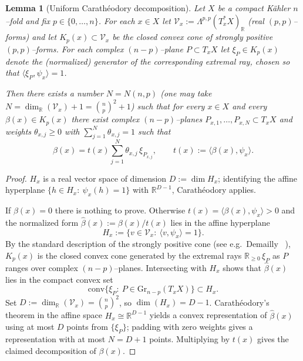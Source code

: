 \documentclass[11pt]{article}
\newcommand{\REVMZ}[1]{\textcolor{teal}{#1}}  %
\numberwithin{equation}{section}  %
\theoremstyle{plain}
\newtheorem{lemma}[theorem]{Lemma}
\theoremstyle{definition}
\theoremstyle{remark}
\newcommand{\R}{\mathbb{R}}
\newcommand{\Gr}{\mathrm{Gr}}
\begin{document}
\begin{lemma}[Uniform Carath\'eodory decomposition]\label{lem:caratheodory-general}
Let $X$ be a compact K\"ahler $n$--fold and fix $p\in\{0,\dots,n\}$.
For each $x\in X$ let $\mathcal V_x:=\Lambda^{p,p}(T_x^*X)_{\R}$ (real $(p,p)$--forms) and let
$K_p(x)\subset \mathcal V_x$ be the closed convex cone of \emph{strongly positive} $(p,p)$--forms.
For each complex $(n-p)$--plane $P\subset T_xX$ let $\xi_P\in K_p(x)$ denote the (normalized) generator of the corresponding extremal ray,
chosen so that $\langle \xi_P,\psi_x\rangle=1$.

Then there exists a number $N=N(n,p)$ (one may take $N=\dim_{\R}(\mathcal V_x)+1=\binom{n}{p}^2+1$) such that for every $x\in X$ and every
$\beta(x)\in K_p(x)$ there exist complex $(n-p)$--planes $P_{x,1},\dots,P_{x,N}\subset T_xX$ and weights
$\theta_{x,j}\ge 0$ with $\sum_{j=1}^{N}\theta_{x,j}=1$ such that
\[
\beta(x)=t(x)\sum_{j=1}^{N}\theta_{x,j}\,\xi_{P_{x,j}},
\qquad t(x):=\langle \beta(x),\psi_x\rangle.
\]
\end{lemma}

\begin{proof}
\noindent\textbf{} $H_x$ is a real vector space of dimension $D:=\dim H_x$; identifying the affine hyperplane $\{h\in H_x:\ \psi_x(h)=1\}$ with $\R^{D-1}$, Carath\'eodory applies.\par
If $\beta(x)=0$ there is nothing to prove. Otherwise $t(x)=\langle \beta(x),\psi_x\rangle>0$ and the normalized form
$\widehat\beta(x):=\beta(x)/t(x)$ lies in the affine hyperplane
\[
H_x:=\{v\in \mathcal V_x:\ \langle v,\psi_x\rangle=1\}.
\]
By the standard description of the strongly positive cone (see e.g.\ Demailly
~\cite[\S~III.1]{Demailly12}),
$K_p(x)$ is the closed convex cone generated by the extremal rays $\R_{\ge 0}\,\xi_P$ as $P$ ranges over complex $(n-p)$--planes.
Intersecting with $H_x$ shows that $\widehat\beta(x)$ lies in the compact convex set
\[
\mathrm{conv}\{\xi_P:\ P\in \Gr_{n-p}(T_xX)\}\subset H_x.
\]
Set $D:=\dim_{\R}(\mathcal V_x)=\binom{n}{p}^2$, so $\dim(H_x)=D-1$.
Carath\'eodory's theorem \REVMZ{\cite{Schneider14}} in the affine space $H_x\cong \R^{D-1}$ yields a convex representation of $\widehat\beta(x)$
using at most $D$ points from $\{\xi_P\}$; padding with zero weights gives a representation with at most $N=D+1$ points.
Multiplying by $t(x)$ gives the claimed decomposition of $\beta(x)$.
\end{proof}
\end{document}
